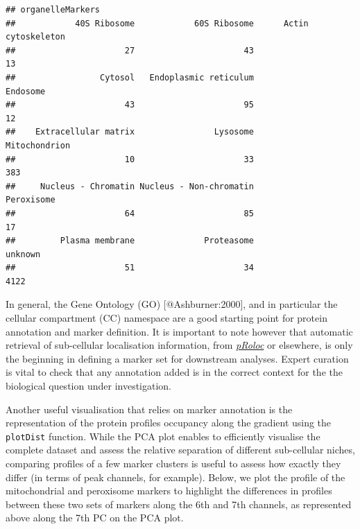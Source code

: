 \begin{Shaded}
\begin{Highlighting}[]
\StringTok{ } \NormalTok{, } \NormalTok{)}
\end{Highlighting}
\end{Shaded}

\begin{verbatim}
## organelleMarkers
##            40S Ribosome            60S Ribosome      Actin cytoskeleton 
##                      27                      43                      13 
##                 Cytosol   Endoplasmic reticulum                Endosome 
##                      43                      95                      12 
##    Extracellular matrix                Lysosome           Mitochondrion 
##                      10                      33                     383 
##     Nucleus - Chromatin Nucleus - Non-chromatin              Peroxisome 
##                      64                      85                      17 
##         Plasma membrane              Proteasome                 unknown 
##                      51                      34                    4122
\end{verbatim}

In general, the Gene Ontology (GO) {[}@Ashburner:2000{]}, and in
particular the cellular compartment (CC) namespace are a good starting
point for protein annotation and marker definition. It is important to
note however that automatic retrieval of sub-cellular localisation
information, from
\emph{\href{http://bioconductor.org/packages/pRoloc}{pRoloc}} or
elsewhere, is only the beginning in defining a marker set for downstream
analyses. Expert curation is vital to check that any annotation added is
in the correct context for the the biological question under
investigation.

Another useful visualisation that relies on marker annotation is the
representation of the protein profiles occupancy along the gradient
using the \texttt{plotDist} function. While the PCA plot enables to
efficiently visualise the complete dataset and assess the relative
separation of different sub-cellular niches, comparing profiles of a few
marker clusters is useful to assess how exactly they differ (in terms of
peak channels, for example). Below, we plot the profile of the
mitochondrial and peroxisome markers to highlight the differences in
profiles between these two sets of markers along the 6th and 7th
channels, as represented above along the 7th PC on the PCA plot.

